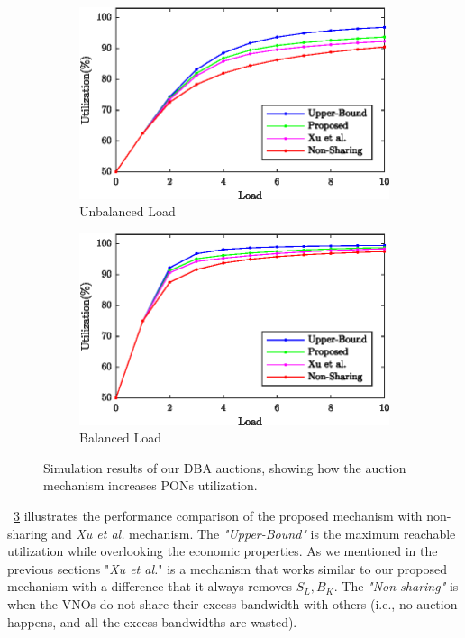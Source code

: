 \begin{figure}[h]
\centering
\begin{subfigure}{0.49\columnwidth}
\includegraphics[width=\columnwidth]{Figures/fig1b}%
\caption{Unbalanced Load}%
\label{Unbalanced_Utilization}%
\end{subfigure}\hfill%
\begin{subfigure}{0.49\columnwidth}
\includegraphics[width=\columnwidth]{Figures/fig1a}%
\caption{Balanced Load}%
\label{Balanced_Utilization}%
\end{subfigure}\hfill%
\caption{Simulation results of our \ac{DBA} auctions, showing how the auction mechanism increases \acp{PON} utilization.}
\label{Utilization}%
\end{figure}

\figureautorefname~\ref{Utilization} illustrates the performance comparison of the proposed mechanism with non-sharing and \textit{Xu et al.} \cite{5462277} mechanism. The \textit{"Upper-Bound"} is the maximum reachable utilization while overlooking the economic properties. As we mentioned in the previous sections "\textit{Xu et al.}" is a mechanism that works similar to our proposed mechanism with a difference that it always removes $S_L , B_K$. The \textit{"Non-sharing"} is when the \acp{VNO} do not share their excess bandwidth with others (i.e., no auction happens, and all the excess bandwidths are wasted).

